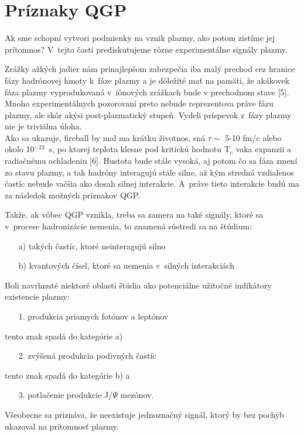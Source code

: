 \section{Príznaky QGP}
Ak sme schopní vytvori\softt{} podmienky na vznik plazmy, ako potom 
zistíme jej prí\-tom\-nos\softt{}? V~tejto časti prediskutujeme
rôzne experimentálne signály plazmy.

Zrážky \softt{}ažkých jadier nám prinajlepšom 
zabezpečia iba malý prechod cez hranice fázy
hadrónovej hmoty k~fáze plazmy a je dôležité  mať na
pamäti, že akáko\softl{}vek fáza plazmy vyprodukovaná
v~iónových zrážkach bude v prechodnom stave [5]. Mnoho
experimentálnych pozorovaní preto nebude reprezentova\softt{}
práve fázu plazmy, ale skôr akýsi post-plazmatický stupeň.
Vydeli\softt{} príspevok z~fázy plazmy nie je triviálna úloha. \\
\hspace*{0.45cm} Ako sa ukazuje, fireball by mal ma\softt{} krátku 
životnos\softt{}, sná\softd{} $\tau\sim$ 5-10 fm/c alebo okolo
10$^{-23}$~s, po ktorej teplota klesne pod kritickú hodnotu T$_{c}$
v\softd{}aka expanzii a radiačnému ochladeniu [6]. Hustota bude
stále vysoká, aj potom čo sa fáza zmení zo stavu plazmy, a tak
hadróny interagujú stále silne, až kým stredná
vzdialenos\softt{} častíc nebude vačšia ako dosah silnej
interakcie. A~práve tieto interakcie budú ma\softt{} za následok
 možných príznakov QGP.

Takže, ak vôbec QGP vznikla, treba sa zamera\softt{} na také 
signály, ktoré sa  v~procese hadronizácie nemenia, to znamená
sústredi\softt{} sa na štúdium:
\begin{enumerate}
  \item[a)] takých častíc, ktoré neinteragujú silno
  \item[b)] kvantových čísel, ktoré sa nemenia v~silných 
interakciách
\end{enumerate}
Boli navrhnuté niektoré oblasti štúdia ako potenciálne 
užitočné indikátory existencie plazmy: 
\begin{enumerate}
  \item[1.] produkcia priamych fotónov a leptónov
\end{enumerate}
tento znak spadá do kategórie a)
\begin{enumerate}
  \item[2.] zvýšená produkcia podivných častíc 
\end{enumerate}
tento znak spadá do kategórie b) a
\begin{enumerate}
  \item[3.] potlačenie produkcie J/$\Psi$ mezónov.
\end{enumerate}
Všeobecne sa priznáva, že neexistuje jednoznačný signál, ktorý by bez pochýb
ukazoval na prítomnosť plazmy.

